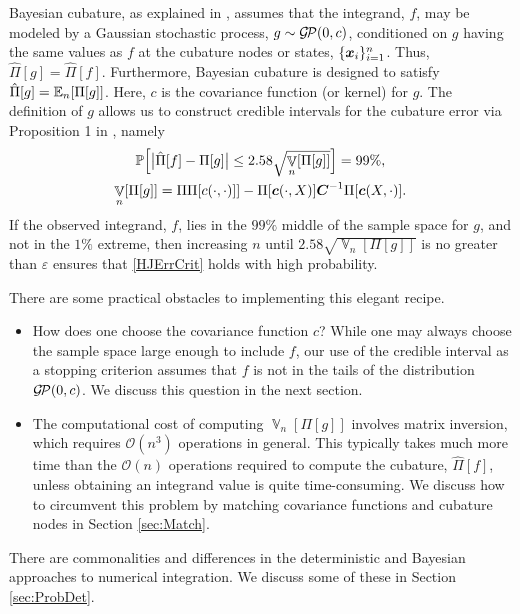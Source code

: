 \documentclass[sts]{imsart}
\numberwithin{equation}{section}
\theoremstyle{plain}
\newcommand{\vC}{\boldsymbol{C}}
\newcommand{\calGP}{\cg\!\cp}
\DeclareMathOperator{\Var}{\mathbb{V}}
\newcommand{\BOGOS}{\citetalias{BriEtal18a}}%
\begin{document}
Bayesian cubature, as explained in \BOGOS{}, assumes that the integrand, $f$, may be modeled by a Gaussian stochastic process, $g \sim \calGP(0,c)$, conditioned on $g$ having the same values as $f$ at the cubature nodes or states, $\{\boldsymbol{x}_i\}_{i=1}^n$.  Thus, $\hat{\Pi}[g] = \hat{\Pi}[f]$.  Furthermore, Bayesian cubature is designed to satisfy $\hat{\Pi}[g] = \operatorname{\mathbb{E}}_n[\Pi[g]]$.  Here, $c$ is the covariance function (or kernel) for $g$.  The definition of $g$ allows us to construct credible intervals for the cubature error via Proposition 1 in  \BOGOS{}, namely
\begin{gather}
\label{credInt}
    \Prob\Bigl[\bigl \lvert \hat{\Pi}[f] - \Pi[g] \bigr \rvert \le 2.58 \sqrt{\Var_n[\Pi[g]]}  \Bigr] = 99\%, \\
    \label{Vnform}
    \Var_n[\Pi[g]] = \Pi\Pi[c(\cdot,\cdot)]] - \Pi[\vc(\cdot,X)] \vC^{-1} \Pi[\vc(X,\cdot)].
\end{gather}
If the observed integrand, $f$, lies in the $99\%$ middle of the sample space for $g$, and not in the $1\%$ extreme, then increasing $n$ until $2.58 \sqrt{\Var_n[\Pi[g]]}$ is no greater than $\varepsilon$ ensures that  \eqref{HJErrCrit} holds with high probability.

There are some practical obstacles to implementing this elegant recipe. 

\begin{itemize} 

\item How does one choose the covariance function $c$?  While one may always choose the sample space large enough to include $f$, our use of the credible interval as a stopping criterion assumes that $f$ is not in the tails of the distribution $\calGP(0,c)$.  We discuss this question in the next section.  

\item The computational cost of computing $\Var_n[\Pi[g]]$ involves matrix inversion, which requires $\mathcal{O}(n^3)$ operations in general.  This typically takes much more time than the $\mathcal{O}(n)$ operations required to compute the cubature, $\hat{\Pi}[f]$, unless obtaining an integrand value is quite time-consuming. We discuss how to circumvent this problem by matching covariance functions and cubature nodes in Section \ref{sec:Match}.

\end{itemize}
There are commonalities and differences in the deterministic and Bayesian approaches to numerical integration.  We discuss some of these in Section \ref{sec:ProbDet}.
\end{document}
